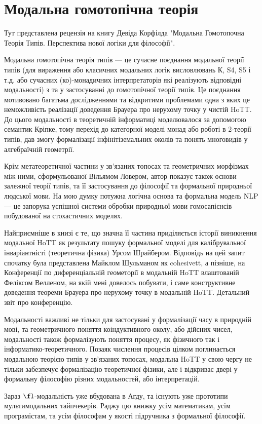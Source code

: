 \section{Модальна гомотопічна теорія}

Тут представлена рецензія на книгу Девіда
Корфілда "Модальна Гомотопочна Теорія Типів.
Перспектива нової логіки для філософії".

Модальна гомотопічна теорія типів --- це сучасне
поєднання модальної теорії типів (для вираження
або класичних модальних логік висловлювань К, S4, S5 і т.д. або
сучасних (ко)-монадичних інтерпретаторів які реалізують
відповідні модальності) з та у застосуванні до гомотопічної
теорії типів. Це поєднання мотивовано багатьма дослідженнями
та відкритими проблемами одна з яких це неможливість реалізації
доведення Брауера про нерухому точку у чистій HoTT. До цього
модальності в теоретичній інформатиці моделювалося за допомогою
семантик Кріпке, тому перехід до категорної моделі монад або
роботі в 2-теорії типів, дав змогу формалізації інфінітіземальних
околів та понять многовидів у алгебраїчній геометрії.

Крім метатеоретичної частини у зв'язаних топосах та геометричних
морфізмах між ними, сформульованої Вільямом Ловером, автор
показує також основи залежної теорії типів, та її застосування
до філософії та формальної природньої людської мови. На мою думку
потужна логічна основа та формальна модель NLP --- це запорука
успішної системи обробки природньої мови гомосапієнсів побудованої
на стохастичних моделях.

Найприємніше в книзі є те, що значна її частина приділяється
історії виникнення модальної HoTT як результату пошуку формальної
моделі для калібрувальної інваріантністі (теоретична фізика) Урсом
Шрайбером. Відповідь на цей запит спочатку була представлена Майклом
Шульманом як cohesivett, а пізніше, на Конференції по диференціальній
геометорії в модальній HoTT влаштованій Феліксом Велленом, на якій
мені довелось побувати, і саме конструктивне доведення теореми Брауера
про нерухому точку в модальній HoTT. Детальний звіт про конференцію.

Модальності важливі не тільки для застосувані у формалізації
часу в природній мові, та геометричного поняття коіндуктивного
околу, або дійсних чисел, модальності також формалізують поняття
процесу, як фізичного так і інформатико-теоретичного. Позаяк числення
процесів цілком поглинається модальною теорією типів у зв'язаних
топосах, модальна HoTT у свою чергу не тільки забезпечує формалізацію
теоретичної фізики, але і відкриває двері у формальну філософію різних
модальностей, або інтерпретацій.

Зараз $\fl$-модальність уже вбудована в Агду, та існують уже прототипи
мультимодальних тайпчекерів. Раджу цю книжку усім математикам, усім
програмістам, та усім філософам у якості підручника з формальної філософії.
